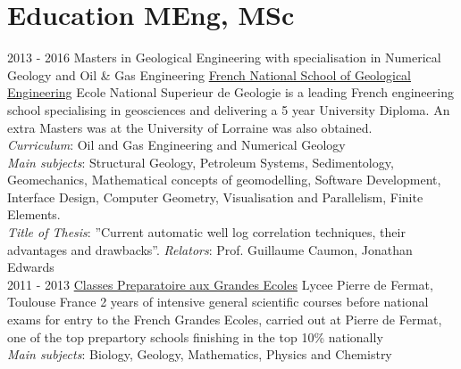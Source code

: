 \documentclass[]{friggeri-cv}
\begin{document}
\section{Education MEng, MSc}
\begin{entrylist}
  \entry
    {2013 - 2016}
    {Masters in Geological Engineering with specialisation in Numerical Geology and Oil \& Gas Engineering}
    {\href{http://ensg.univ-lorraine.fr/english/}{French National School of Geological Engineering}}
    {Ecole National Superieur de Geologie is a leading French engineering school specialising in geosciences and delivering a 5 year University Diploma. An extra Masters was at the University of Lorraine was also obtained.\\ \emph{Curriculum}: Oil and Gas Engineering and Numerical Geology\\ 
    \emph{Main subjects}: Structural Geology, Petroleum Systems, Sedimentology, Geomechanics, Mathematical concepts of geomodelling, Software Development, Interface Design, Computer Geometry, Visualisation and Parallelism, Finite Elements.\\
    \emph{Title of Thesis}: ”Current automatic well log correlation techniques, their advantages and drawbacks”.
    \emph{Relators}: Prof. Guillaume Caumon, Jonathan Edwards\\}
  \entry
    {2011 - 2013}
    {\href{https://en.wikipedia.org/wiki/Classe_preparatoire_aux_grandes_ecoles}{Classes Preparatoire aux Grandes Ecoles}}
    {Lycee Pierre de Fermat, Toulouse France}
    {2 years of intensive general scientific courses before national exams for entry to the French Grandes Ecoles, carried out at Pierre de Fermat, one of the top prepartory schools finishing in the top 10\% nationally\\ 
    \emph{Main subjects}: Biology, Geology, Mathematics, Physics and Chemistry\\}
\end{entrylist}
\vspace*{\fill}
\end{document}
